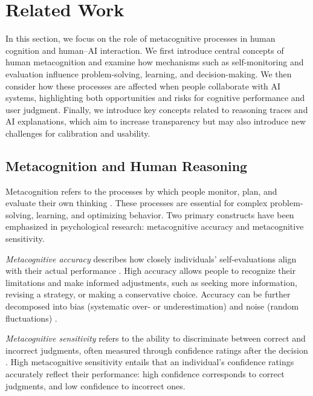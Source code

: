 \documentclass[manuscript,review,anonymous]{acmart}
\begin{document}





\section{Related Work}

In this section, we focus on the role of metacognitive processes in human cognition and human–AI interaction. We first introduce central concepts of human metacognition and examine how mechanisms such as self-monitoring and evaluation influence problem-solving, learning, and decision-making. We then consider how these processes are affected when people collaborate with AI systems, highlighting both opportunities and risks for cognitive performance and user judgment. Finally, we introduce key concepts related to reasoning traces and AI explanations, which aim to increase transparency but may also introduce new challenges for calibration and usability.

\subsection{Metacognition and Human Reasoning}\label{sec:human_metacognition}
Metacognition refers to the processes by which people monitor, plan, and evaluate their own thinking \cite{fleming2024metacognition}. These processes are essential for complex problem-solving, learning, and optimizing behavior. Two primary constructs have been emphasized in psychological research: metacognitive accuracy and metacognitive sensitivity.

\textit{Metacognitive accuracy} describes how closely individuals' self-evaluations align with their actual performance \cite{fleming2024metacognition, colombatto2023illusions}. High accuracy allows people to recognize their limitations and make informed adjustments, such as seeking more information, revising a strategy, or making a conservative choice. Accuracy can be further decomposed into bias (systematic over- or underestimation) and noise (random fluctuations) \cite{fiedler2019metacognition}.

\textit{Metacognitive sensitivity} refers to the ability to discriminate between correct and incorrect judgments, often measured through confidence ratings after the decision \cite{fleming2024metacognition}. High metacognitive sensitivity entails that an individual's confidence ratings accurately reflect their performance: high confidence corresponds to correct judgments, and low confidence to incorrect ones.
\end{document}

